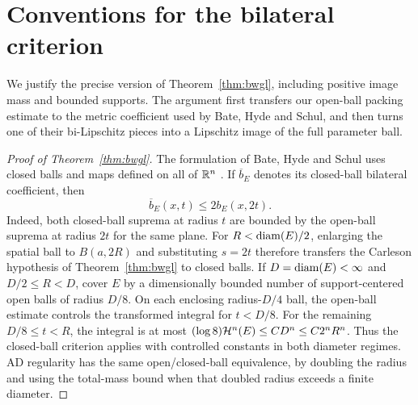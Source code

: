\section{Conventions for the bilateral criterion}
\label{app:geometric-conventions}

We justify the precise version of Theorem~\ref{thm:bwgl}, including
positive image mass and bounded supports. The argument first transfers
our open-ball packing estimate to the metric coefficient used by
Bate, Hyde and Schul, and then turns one of their bi-Lipschitz pieces
into a Lipschitz image of the full parameter ball.

\begin{proof}[Proof of Theorem~\ref{thm:bwgl}]
The formulation of Bate, Hyde and Schul uses closed balls and maps
defined on all of $\mathbb R^n$ \cite[Theorem~1.0.4]{BateHydeSchul2023}.
If $\overline b_E$ denotes its closed-ball bilateral coefficient, then
\[
 \overline b_E(x,t)\leq2b_E(x,2t).
\]
Indeed, both closed-ball suprema at radius $t$ are bounded by the
open-ball suprema at radius $2t$ for the same plane. For
$R<\operatorname{diam}(E)/2$, enlarging the spatial ball to $B(a,2R)$ and substituting
$s=2t$ therefore transfers the Carleson hypothesis of
Theorem~\ref{thm:bwgl} to closed balls. If $D=\operatorname{diam}(E)<\infty$ and
$D/2\leq R<D$, cover $E$ by a
dimensionally bounded number of support-centered open balls of radius
$D/8$. On each enclosing radius-$D/4$ ball, the open-ball estimate
controls the transformed integral for $t<D/8$. For the remaining
$D/8\leq t<R$, the integral is at most
$(\log8)\mathcal H^n(E)\leq C D^n\leq C2^nR^n$.
Thus the closed-ball criterion applies with controlled constants in
both diameter regimes. AD regularity has the same open/closed-ball
equivalence, by doubling the radius and using the total-mass bound
when that doubled radius exceeds a finite diameter.


\end{proof}
